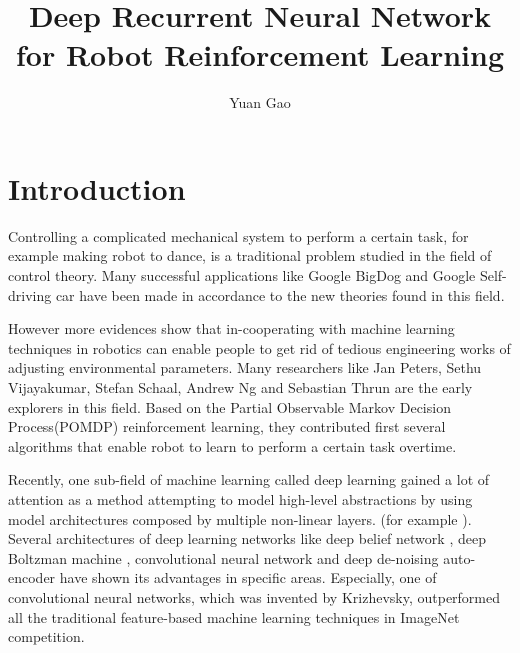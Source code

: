\documentclass[officiallayout]{tktla}
\title{Deep Recurrent Neural Network for Robot Reinforcement Learning \\}
\author{Yuan Gao}
\begin{document}
\frontmatter
\maketitle
\begin{abstract}

\end{abstract}

\begin{acknowledgements}

\end{acknowledgements}

\tableofcontents



\mainmatter
\chapter{Introduction}

Controlling a complicated mechanical system to perform a certain task, for example making robot to dance, is a traditional problem studied in the field of control theory. Many successful applications like Google BigDog\cite{Raibert2008} and Google Self-driving car \cite{guizzo2011google} have been made in accordance to the new theories found in this field.

However more evidences show that in-cooperating with machine learning techniques in robotics can enable people to get rid of tedious engineering works of adjusting environmental parameters. Many researchers like Jan Peters, Sethu Vijayakumar, Stefan Schaal, Andrew Ng and Sebastian Thrun are the early explorers in this field. Based on the Partial Observable Markov Decision Process(POMDP) reinforcement learning, they contributed first several algorithms that enable robot to learn to perform a certain task overtime.

Recently, one sub-field of machine learning called deep learning gained a lot of attention as a method attempting to model high-level abstractions by using model architectures composed by multiple non-linear layers. (for example \cite{Krizhevsky2012}). Several architectures of deep learning networks like deep belief network \cite{Hinton2006}, deep Boltzman machine \cite{Salakhutdinov2009}, convolutional neural network \cite{Krizhevsky2012} and deep de-noising auto-encoder \cite{Vincent2010} have shown its advantages in specific areas. Especially, one of convolutional neural networks, which was invented by Krizhevsky, outperformed all the traditional feature-based machine learning techniques in ImageNet competition.
\end{document}
